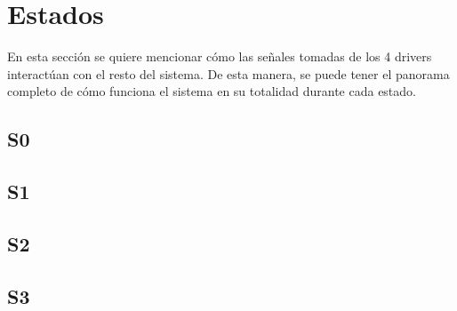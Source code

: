 \documentclass[12pt,onecolumn]{IEEEtran}
\begin{document}
\section{Estados} %

En esta sección se quiere mencionar cómo las señales tomadas de los 4 drivers interactúan con el resto del sistema. De esta manera, se puede tener el panorama completo de cómo funciona el sistema en su totalidad durante cada estado. 

\subsection{S0}



\subsection{S1}

\subsection{S2}

\subsection{S3}
\end{document}
